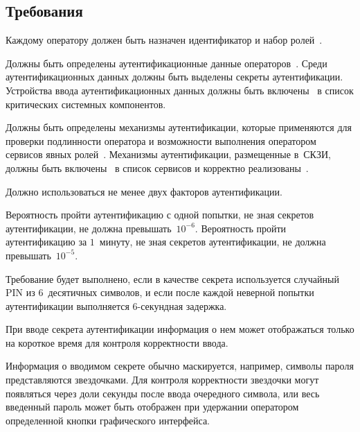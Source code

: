\subsection{Требования}\label{IA.Reqs}

\label{R.IA.Id} %
Каждому оператору должен быть назначен идентификатор и набор 
ролей~.

\label{R.IA.AuthData} %
Должны быть определены аутентификационные данные операторов~.
% 
Среди аутентификационных данных должны быть выделены 
секреты аутентификации.
%
Устройства ввода аутентификационных данных должны быть
включены~ в список критических системных компонентов. 

\label{R.IA.Auth} %
Должны быть определены механизмы аутентификации, которые применяются для
проверки подлинности оператора и возможности выполнения оператором сервисов
явных ролей~.
%
Механизмы аутентификации, размещенные в~СКЗИ, должны быть
включены~ в список сервисов и корректно
реализованы~.

\label{R.IA.2FA} %
Должно использоваться не менее двух факторов аутентификации.

\label{R.IA.AuthStrength} %
Вероятность пройти аутентификацию с одной попытки, не зная секретов
аутентификации, не должна превышать~$10^{-6}$.
%
Вероятность пройти аутентификацию за $1$~минуту, не зная секретов 
аутентификации, не должна превышать~$10^{-5}$.

\begin{note}
Требование будет выполнено, если в качестве секрета используется случайный PIN
из $6$~десятичных символов, и если после каждой неверной попытки аутентификации
выполняется $6$-секундная задержка.
\end{note}

\label{R.IA.PwdMask} %
При вводе секрета аутентификации информация о нем может отображаться только на 
короткое время для контроля корректности ввода.

\begin{note}
Информация о вводимом секрете обычно маскируется, например, символы пароля
представляются звездочками. Для контроля корректности звездочки могут появляться
через доли секунды после ввода очередного символа, или весь 
введенный пароль может быть отображен при удержании оператором определенной 
кнопки графического интерфейса.
\end{note}

